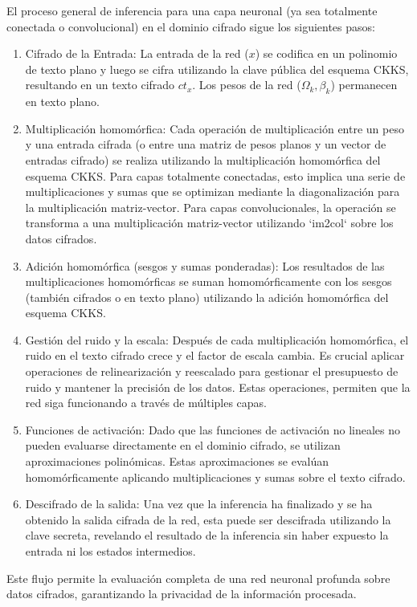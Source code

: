 El proceso general de inferencia para una capa neuronal (ya sea totalmente conectada o convolucional) en el dominio cifrado sigue los siguientes pasos:
\begin{enumerate}
    \item Cifrado de la Entrada: La entrada de la red ($x$) se codifica en un polinomio de texto plano y luego se cifra utilizando la clave pública del esquema CKKS, resultando en un texto cifrado $ct_x$. Los pesos de la red ($\Omega_k, \beta_k$) permanecen en texto plano.
    \item Multiplicación homomórfica: Cada operación de multiplicación entre un peso y una entrada cifrada (o entre una matriz de pesos planos y un vector de entradas cifrado) se realiza utilizando la multiplicación homomórfica del esquema CKKS. Para capas totalmente conectadas, esto implica una serie de multiplicaciones y sumas que se optimizan mediante la diagonalización para la multiplicación matriz-vector. Para capas convolucionales, la operación se transforma a una multiplicación matriz-vector utilizando `im2col` \cite{Goodfellow16} sobre los datos cifrados.
    \item Adición homomórfica (sesgos y sumas ponderadas): Los resultados de las multiplicaciones homomórficas se suman homomórficamente con los sesgos (también cifrados o en texto plano) utilizando la adición homomórfica del esquema CKKS.
    \item Gestión del ruido y la escala: Después de cada multiplicación homomórfica, el ruido en el texto cifrado crece y el factor de escala cambia. Es crucial aplicar operaciones de relinearización y reescalado para gestionar el presupuesto de ruido y mantener la precisión de los datos. Estas operaciones, permiten que la red siga funcionando a través de múltiples capas.
    \item Funciones de activación: Dado que las funciones de activación no lineales no pueden evaluarse directamente en el dominio cifrado, se utilizan aproximaciones polinómicas. Estas aproximaciones se evalúan homomórficamente aplicando multiplicaciones y sumas sobre el texto cifrado.
    \item Descifrado de la salida: Una vez que la inferencia ha finalizado y se ha obtenido la salida cifrada de la red, esta puede ser descifrada utilizando la clave secreta, revelando el resultado de la inferencia sin haber expuesto la entrada ni los estados intermedios.
\end{enumerate}
Este flujo permite la evaluación completa de una red neuronal profunda sobre datos cifrados, garantizando la privacidad de la información procesada.


